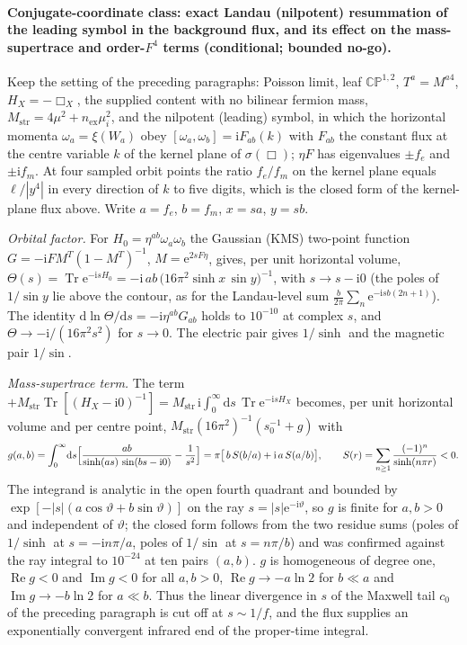 \paragraph{Conjugate-coordinate class: exact Landau (nilpotent) resummation of the leading symbol in the background flux, and its effect on the mass-supertrace and order-\(F^4\) terms (conditional; bounded no-go).}
Keep the setting of the preceding paragraphs: Poisson limit, leaf \(\mathbb{CP}^{1,2}\), \(T^a=M^{a4}\), \(H_X=-\Box_X\), the supplied content with no bilinear fermion mass, \(M_{\mathrm{str}}=4\mu^2+n_{\mathrm{ex}}\mu_i^2\), and the nilpotent (leading) symbol, in which the horizontal momenta \(\omega_a=\xi(W_a)\) obey \([\omega_a,\omega_b]=\mathrm iF_{ab}(k)\) with \(F_{ab}\) the constant flux at the centre variable \(k\) of the kernel plane of \(\sigma(\Box)\); \(\eta F\) has eigenvalues \(\pm f_e\) and \(\pm\mathrm if_m\). At four sampled orbit points the ratio \(f_e/f_m\) on the kernel plane equals \(\ell/|y^4|\) in every direction of \(k\) to five digits, which is the closed form of the kernel-plane flux above. Write \(a=f_e\), \(b=f_m\), \(x=sa\), \(y=sb\).

\emph{Orbital factor.} For \(H_0=\eta^{ab}\omega_a\omega_b\) the Gaussian (KMS) two-point function \(G=-\mathrm iFM^{T}(1-M^{T})^{-1}\), \(M=\mathrm e^{2sF\eta}\), gives, per unit horizontal volume, \(\Theta(s)=\operatorname{Tr}\mathrm e^{-\mathrm isH_0}=-\mathrm i\,ab\,\bigl(16\pi^2\sinh x\,\sin y\bigr)^{-1}\), with \(s\to s-\mathrm i0\) (the poles of \(1/\sin y\) lie above the contour, as for the Landau-level sum \(\tfrac{b}{2\pi}\sum_n\mathrm e^{-\mathrm isb(2n+1)}\)). The identity \(\mathrm d\ln\Theta/\mathrm ds=-\mathrm i\eta^{ab}G_{ab}\) holds to \(10^{-10}\) at complex \(s\), and \(\Theta\to-\mathrm i/(16\pi^2s^2)\) for \(s\to0\). The electric pair gives \(1/\sinh\) and the magnetic pair \(1/\sin\).

\emph{Mass-supertrace term.} The term \(+M_{\mathrm{str}}\operatorname{Tr}[(H_X-\mathrm i0)^{-1}]=M_{\mathrm{str}}\,\mathrm i\!\int_0^\infty\!\mathrm ds\,\operatorname{Tr}\mathrm e^{-\mathrm isH_X}\) becomes, per unit horizontal volume and per centre point, \(M_{\mathrm{str}}(16\pi^2)^{-1}(s_0^{-1}+g)\) with
\[
g(a,b)=\int_0^\infty\!\mathrm ds\Bigl[\frac{ab}{\sinh(as)\,\sin(bs-\mathrm i0)}-\frac1{s^2}\Bigr]=\pi\bigl[\,b\,S(b/a)+\mathrm i\,a\,S(a/b)\bigr],\qquad S(r)=\sum_{n\ge1}\frac{(-1)^n}{\sinh(n\pi r)}<0 .
\]
The integrand is analytic in the open fourth quadrant and bounded by \(\exp[-|s|(a\cos\vartheta+b\sin\vartheta)]\) on the ray \(s=|s|\mathrm e^{-\mathrm i\vartheta}\), so \(g\) is finite for \(a,b>0\) and independent of \(\vartheta\); the closed form follows from the two residue sums (poles of \(1/\sinh\) at \(s=-\mathrm in\pi/a\), poles of \(1/\sin\) at \(s=n\pi/b\)) and was confirmed against the ray integral to \(10^{-24}\) at ten pairs \((a,b)\). \(g\) is homogeneous of degree one, \(\operatorname{Re}g<0\) and \(\operatorname{Im}g<0\) for all \(a,b>0\), \(\operatorname{Re}g\to-a\ln2\) for \(b\ll a\) and \(\operatorname{Im}g\to-b\ln2\) for \(a\ll b\). Thus the linear divergence in \(s\) of the Maxwell tail \(c_0\) of the preceding paragraph is cut off at \(s\sim1/f\), and the flux supplies an exponentially convergent infrared end of the proper-time integral.

